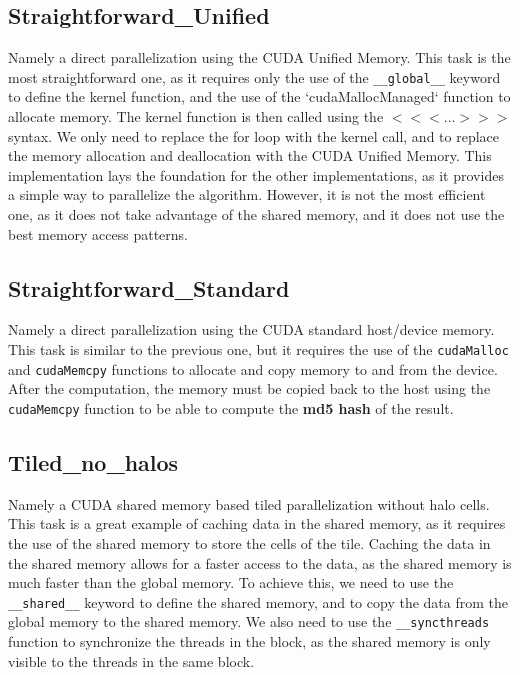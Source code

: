 \documentclass{article}
\begin{document}
\subsection{Straightforward\_Unified}
Namely a direct parallelization using the CUDA Unified Memory.
This task is the most straightforward one, as it requires only the use of the \texttt{\_\_global\_\_} keyword to define the kernel function, and the use of the `cudaMallocManaged` function to allocate memory. The kernel function is then called using the $<<<...>>>$ syntax. We only need to replace the for loop with the kernel call, and to replace the memory allocation and deallocation with the CUDA Unified Memory.
This implementation lays the foundation for the other implementations, as it provides a simple way to parallelize the algorithm. However, it is not the most efficient one, as it does not take advantage of the shared memory, and it does not use the best memory access patterns.

\subsection{Straightforward\_Standard}
Namely a direct parallelization using the CUDA standard host/device memory.
This task is similar to the previous one, but it requires the use of the \texttt{cudaMalloc} and \texttt{cudaMemcpy} functions to allocate and copy memory to and from the device. After the computation, the memory must be copied back to the host using the \texttt{cudaMemcpy} function to be able to compute the \textbf{md5 hash} of the result.

\subsection{Tiled\_no\_halos}
Namely a CUDA shared memory based tiled parallelization without halo cells.
This task is a great example of caching data in the shared memory, as it requires the use of the shared memory to store the cells of the tile. Caching the data in the shared memory allows for a faster access to the data, as the shared memory is much faster than the global memory. To achieve this, we need to use the \texttt{\_\_shared\_\_} keyword to define the shared memory, and to copy the data from the global memory to the shared memory. We also need to use the \texttt{\_\_syncthreads} function to synchronize the threads in the block, as the shared memory is only visible to the threads in the same block.

\newpage
\end{document}
